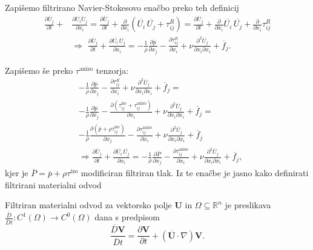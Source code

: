 \documentclass[mat2, tisk]{fmfdelo}
\newcommand{\R}{\mathbb R}
\newcommand{\bd}{\textbf}
\begin{document}
Zapišemo filtrirano Navier-Stokesovo enačbo preko teh definicij
\begin{align*}
\frac{\partial \overline{U}_j}{\partial t} + &\frac{\partial \overline{U_i U_j}}{\partial x_i} = 
\frac{\partial \overline{U}_j}{\partial t} + \frac{\partial}{\partial x_i} (\overline{U_i}\, \overline{U_j} + \tau_{ij}^R) = 
\frac{\partial \overline{U}_j}{\partial t} + \frac{\partial}{\partial x_i} \overline{U_i}\, \overline{U_j} + \frac{\partial}{\partial x_i} \tau_{ij}^R\\[2mm]
&\Longrightarrow \,\,
\frac{\partial \overline{U}_j}{\partial t} + \frac{\partial \overline{U_i}\, \overline{U_j}}{\partial x_i} = -\frac{1}{\rho} \frac{\partial \overline{p}}{\partial x_j} 
- \frac{\partial \tau_{ij}^R}{\partial x_i}+ \nu \frac{\partial^2 \overline{U}_j}{\partial x_i \partial x_i} + \overline{f}_j.
\end{align*}

Zapišemo še preko $\tau^\text{anizo}$ tenzorja:
\begin{align*}
&-\frac{1}{\rho} \frac{\partial \overline{p}}{\partial x_j} - \frac{\partial \tau_{ij}^R}{\partial x_i}+ \nu \frac{\partial^2 \overline{U}_j}{\partial x_i \partial x_i} + \overline{f}_j = \\[1mm]
&-\frac{1}{\rho} \frac{\partial \overline{p}}{\partial x_j} - \frac{\partial (\tau^\text{izo}_{ij} + \tau^\text{anizo}_{ij}) }{\partial x_i}+ \nu \frac{\partial^2 \overline{U}_j}{\partial x_i \partial x_i} + \overline{f}_j = \\[1mm]
&-\frac{1}{\rho} \frac{\partial (\overline{p} + \rho\tau^\text{izo}_{ij})}{\partial x_j} - \frac{\partial \tau^\text{anizo}_{ij} }{\partial x_i}+ \nu \frac{\partial^2 \overline{U}_j}{\partial x_i \partial x_i} + \overline{f}_j \\[2mm]
&\Longrightarrow 
\frac{\partial \overline{U}_j}{\partial t} + \frac{\partial \overline{U_i}\, \overline{U_j}}{\partial x_i} = -\frac{1}{\rho} \frac{\partial \overline{P}}{\partial x_j} 
- \frac{\partial \tau_{ij}^\text{anizo}}{\partial x_i}+ \nu \frac{\partial^2 \overline{U}_j}{\partial x_i \partial x_i} + \overline{f}_j,
\end{align*}
kjer je $\overline{P} = \overline{p} + \rho\tau^\text{izo}$ modificiran filtriran tlak. Iz te enačbe je jasno kako definirati filtrirani materialni odvod 
\begin{definicija}
Filtriran materialni odvod za vektorsko polje $\bd{U}$ in $\Omega \subseteq \R^n$ je preslikava 
$\frac{\overline{D}}{\overline{D}t}: C^1(\Omega) \rightarrow C^0(\Omega)$ dana s predpisom
\begin{equation}
\frac{\overline{D} \bd{V}}{\overline{D}t} = \frac{\partial \bd{V}}{\partial t} + (\overline{\bd{U}}\cdot \nabla)\bd{V}.
\end{equation}
\end{definicija}
\end{document}
